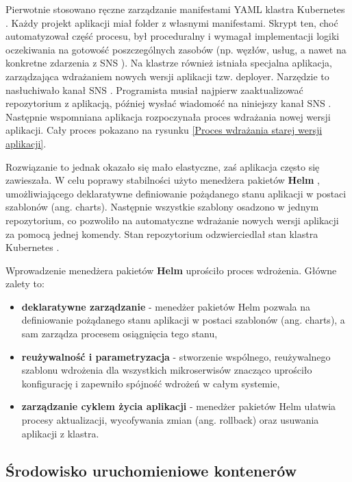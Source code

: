 Pierwotnie stosowano ręczne zarządzanie manifestami YAML \cite{yaml_spec} klastra Kubernetes \cite{kubernetes}. Każdy projekt aplikacji miał folder z własnymi manifestami. Skrypt ten, choć automatyzował część procesu, był proceduralny i wymagał implementacji logiki oczekiwania na gotowość poszczególnych zasobów (np. węzłów, usług, a nawet na konkretne zdarzenia z SNS \cite{sns_docs}). Na klastrze również istniała specjalna aplikacja, zarządzająca wdrażaniem nowych wersji aplikacji tzw. deployer. Narzędzie to nasłuchiwało kanał SNS \cite{sns_docs}. Programista musiał najpierw zaaktualizować repozytorium z aplikacją, później wysłać wiadomość na niniejszy kanał SNS \cite{sns_docs}. Następnie wspomniana aplikacja rozpoczynała proces wdrażania nowej wersji aplikacji. Cały proces pokazano na rysunku \ref{Proces wdrażania starej wersji aplikacji}.


Rozwiązanie to jednak okazało się mało elastyczne, zaś aplikacja często się zawieszała. W celu poprawy stabilności użyto menedżera pakietów \textbf{Helm} \cite{helm_docs}, umożliwiającego deklaratywne definiowanie pożądanego stanu aplikacji w postaci szablonów (ang. charts). Następnie wszystkie szablony osadzono w jednym repozytorium, co pozwoliło na automatyczne wdrażanie nowych wersji aplikacji za pomocą jednej komendy. Stan repozytorium odzwierciedlał stan klastra Kubernetes \cite{kubernetes}.

Wprowadzenie menedżera pakietów \textbf{Helm} \cite{helm_docs} uprościło proces wdrożenia. Główne zalety to:
\begin{itemize}
    \item \textbf{deklaratywne zarządzanie} - menedżer pakietów Helm \cite{helm_docs} pozwala na definiowanie pożądanego stanu aplikacji w postaci szablonów (ang. charts), a sam zarządza procesem osiągnięcia tego stanu,
    \item \textbf{reużywalność i parametryzacja} - stworzenie wspólnego, reużywalnego szablonu wdrożenia dla wszystkich mikroserwisów znacząco uprościło konfigurację i zapewniło spójność wdrożeń w całym systemie,
    \item \textbf{zarządzanie cyklem życia aplikacji} - menedżer pakietów Helm \cite{helm_docs} ułatwia procesy aktualizacji, wycofywania zmian (ang. rollback) oraz usuwania aplikacji z klastra.
\end{itemize}

\subsection{Środowisko uruchomieniowe kontenerów}

